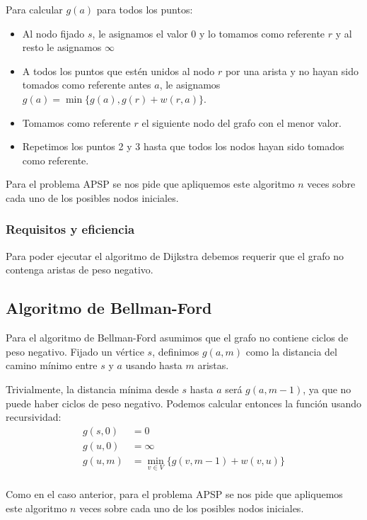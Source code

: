 \documentclass[a4paper, 11pt]{article} %
\begin{document}
    Para calcular $g(a)$ para todos los puntos:
    \begin{itemize}
      \item Al nodo fijado $s$, le asignamos el valor 0 y lo tomamos como referente $r$ y al resto le asignamos $\infty$
      \item A todos los puntos que estén unidos al nodo $r$  por una
      arista y no hayan sido tomados como referente antes $a$, le asignamos $g(a) = \min \{g(a), g(r) + w(r,a)\}$.
      \item Tomamos como referente $r$ el siguiente nodo del grafo con el menor valor.
      \item Repetimos los puntos 2 y 3 hasta que todos los nodos hayan sido tomados como referente.
    \end{itemize}
    
    Para el problema APSP se nos pide que apliquemos este algoritmo $n$ veces sobre cada uno
    de los posibles nodos iniciales.
  
    \subsubsection{Requisitos y eficiencia}
      Para poder ejecutar el algoritmo de Dijkstra debemos requerir que el grafo
      no contenga aristas de peso negativo.

  \subsection{Algoritmo de Bellman-Ford}
    Para el algoritmo de Bellman-Ford asumimos que el grafo no contiene ciclos de peso negativo.
    Fijado un vértice $s$, definimos $g(a,m)$ como la distancia del camino mínimo entre $s$ y $a$
    usando hasta $m$ aristas.
    
    Trivialmente, la distancia mínima desde $s$ hasta $a$ será $g(a,m-1)$, ya que no puede
    haber ciclos de peso negativo. Podemos calcular entonces la función usando recursividad:
    \begin{equation} 
      \begin{split}
	g(s,0)  &=  0 \\
	g(u,0)  &=  \infty \\
	g(u,m)  &=  \min_{v \in V} \{g(v,m-1) + w(v,u)\} \\
      \end{split} 
    \end{equation}

    Como en el caso anterior, para el problema APSP se nos pide que apliquemos este algoritmo $n$ veces sobre cada uno
    de los posibles nodos iniciales.
  
\end{document}
